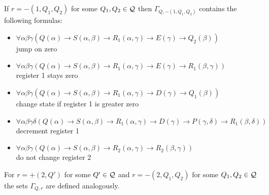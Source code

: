 If $r=-(1,Q_1,Q_2)$ for some $Q_1,Q_2\in\mathcal{Q}$ then $\Gamma_{Q,-(1,Q_1,Q_2)}$ contains the following formulas:
\begin{itemize}
	\item $\forall\alpha\beta\gamma(Q(\alpha)\to S(\alpha,\beta)\to R_1(\alpha,\gamma)\to E(\gamma)\to Q_2(\beta))$\\jump on zero
	\item $\forall\alpha\beta\gamma(Q(\alpha)\to S(\alpha,\beta)\to R_1(\alpha,\gamma)\to E(\gamma)\to R_1(\beta,\gamma))$\\register 1 stays zero
	\item $\forall\alpha\beta\gamma(Q(\alpha)\to S(\alpha,\beta)\to R_1(\alpha,\gamma)\to D(\gamma)\to Q_1(\beta))$\\change state if register 1 is greater zero
	\item $\forall\alpha\beta\gamma\delta(Q(\alpha)\to S(\alpha,\beta)\to R_1(\alpha,\gamma)\to D(\gamma) \to P(\gamma,\delta)\to R_1(\beta,\delta))$\\decrement register 1
	\item $\forall\alpha\beta\gamma(Q(\alpha)\to S(\alpha,\beta)\to R_2(\alpha,\gamma)\to R_2(\beta,\gamma))$\\do not change register 2
\end{itemize}

For $r=+(2,Q')$ for some $Q'\in\mathcal{Q}$ and $r=-(2,Q_1,Q_2)$ for some $Q_1,Q_2\in\mathcal{Q}$ the sets $\Gamma_{Q,r}$ are defined analogously.

